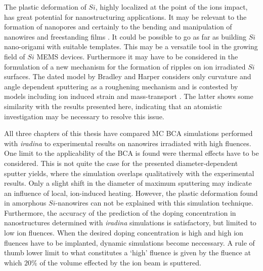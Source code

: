 The plastic deformation of $Si$, highly localized at the point of the ions impact, has great potential for nanostructuring applications. It may be relevant to the formation of nanopores \cite{george_nanopore_2010} and certainly to the bending and manipulation of nanowires \cite{cui_ion-beam-induced_2013} and freestanding films \cite{kim_focused_2006}. It could be possible to go as far as building $Si$ nano-origami \cite{chalapat_self-organized_2013} with suitable templates. This may be a versatile tool in the growing field of $Si$ MEMS devices. Furthermore it may have to be considered in the formulation of a new mechanism for the formation of ripples on ion irradiated $Si$ surfaces. The dated model by Bradley and Harper \cite{bradley_theory_1988} considers only curvature and angle dependent sputtering as a roughening mechanism and is contested by models including ion induced strain and mass-transport \cite{norris_stress-induced_2012,kramczynski_wavelength-dependent_2014}. The latter shows some similarity with the results presented here, indicating that an atomistic investigation may be necessary to resolve this issue.

All three chapters of this thesis have compared MC BCA simulations performed with \emph{iradina} to experimental results on nanowires irradiated with high fluences. One limit to the applicability of the BCA is found were thermal effects have to be considered. This is not quite the case for the presented diameter-dependent sputter yields, where the simulation overlaps qualitatively with the experimental results. Only a slight shift in the diameter of maximum sputtering may indicate an influence of local, ion-induced heating. However, the plastic deformation found in amorphous $Si$-nanowires can not be explained with this simulation technique. Furthermore, the accuracy of the prediction of the doping concentration in nanostructures determined with \emph{iradina} simulations is satisfactory, but limited to low ion fluences. When the desired doping concentration is high and high ion fluences have to be implanted, dynamic simulations become neccessary. A rule of thumb lower limit to what constitutes a `high' fluence is given by the fluence at which $20\%$ of the volume effected by the ion beam is sputtered.
 


